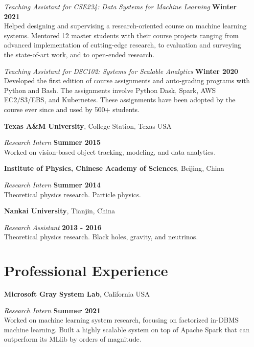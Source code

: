 \documentclass[margin,line]{res}
\begin{document}
\begin{resume}
{\em Teaching Assistant for CSE234: Data Systems for Machine Learning} \hfill {\bf Winter 2021}\\
Helped designing and supervising a research-oriented course on machine learning systems. Mentored 12 master students with their course projects ranging from advanced implementation of cutting-edge research, to evaluation and surveying the state-of-art work, and to open-ended research. 

{\em Teaching Assistant for DSC102: Systems for Scalable Analytics} \hfill {\bf Winter 2020}\\
Developed the first edition of course assignments and auto-grading programs with Python and Bash. The assignments involve Python Dask, Spark, AWS EC2/S3/EBS, and Kubernetes. These assignments have been adopted by the course ever since and used by 500+ students.



{\bf Texas A\&M University}, College Station, Texas USA

\vspace{-.3cm}
{\em Research Intern} \hfill {\bf Summer 2015}\\
Worked on vision-based object tracking, modeling, and data analytics.

{\bf Institute of Physics, Chinese Academy of Sciences}, Beijing, China

\vspace{-.3cm}
{\em Research Intern} \hfill {\bf Summer 2014}\\
Theoretical physics research. Particle physics.

{\bf Nankai University}, Tianjin, China

\vspace{-.3cm}
{\em Research Assistant} \hfill {\bf 2013 - 2016}\\
Theoretical physics research. Black holes, gravity, and neutrinos. 

\section{\sc Professional Experience}
{\bf Microsoft Gray System Lab}, California USA

\vspace{-.3cm}
{\em Research Intern} \hfill {\bf Summer 2021}\\
Worked on machine learning system research, focusing on factorized in-DBMS machine learning. Built a highly scalable system on top of Apache Spark that can outperform its MLlib by orders of magnitude. 


\end{resume}
\end{document}
